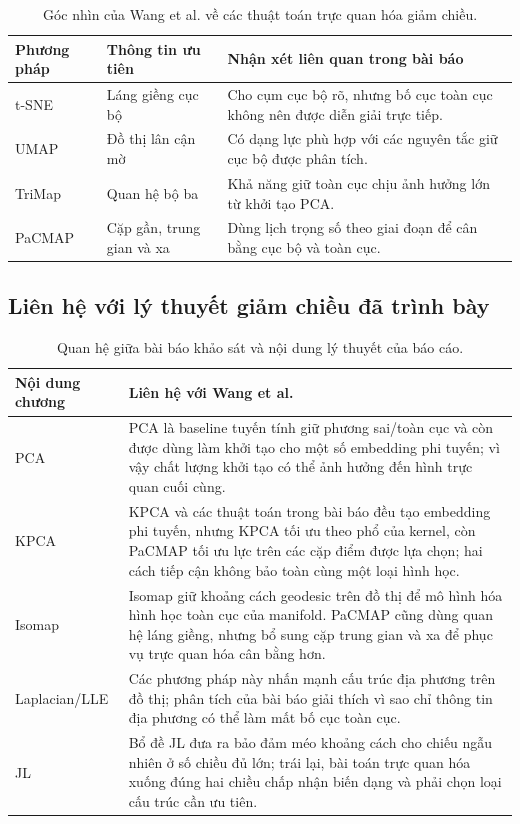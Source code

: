 \begin{table}[H]
  \centering
  \caption{Góc nhìn của Wang et al. về các thuật toán trực quan hóa giảm chiều.}
  \label{tab:related-methods}
  \begin{tabular}{p{}p{}p{}}
    \toprule
    Phương pháp & Thông tin ưu tiên & Nhận xét liên quan trong bài báo \\
    \midrule
    t-SNE & Láng giềng cục bộ & Cho cụm cục bộ rõ, nhưng bố cục toàn cục
    không nên được diễn giải trực tiếp. \\
    UMAP & Đồ thị lân cận mờ & Có dạng lực phù hợp với các nguyên tắc giữ
    cục bộ được phân tích. \\
    TriMap & Quan hệ bộ ba & Khả năng giữ toàn cục chịu ảnh hưởng lớn từ
    khởi tạo PCA. \\
    PaCMAP & Cặp gần, trung gian và xa & Dùng lịch trọng số theo giai đoạn
    để cân bằng cục bộ và toàn cục. \\
    \bottomrule
  \end{tabular}
\end{table}

\subsection{Liên hệ với lý thuyết giảm chiều đã trình bày}

\begin{table}[H]
  \centering
  \caption{Quan hệ giữa bài báo khảo sát và nội dung lý thuyết của báo cáo.}
  \label{tab:related-theory}
  \begin{tabular}{p{}p{}}
    \toprule
    Nội dung chương & Liên hệ với Wang et al. \\
    \midrule
    PCA & PCA là baseline tuyến tính giữ phương sai/toàn cục và còn được
    dùng làm khởi tạo cho một số embedding phi tuyến; vì vậy chất lượng
    khởi tạo có thể ảnh hưởng đến hình trực quan cuối cùng. \\
    KPCA & KPCA và các thuật toán trong bài báo đều tạo embedding phi tuyến,
    nhưng KPCA tối ưu theo phổ của kernel, còn PaCMAP tối ưu lực trên các
    cặp điểm được lựa chọn; hai cách tiếp cận không bảo toàn cùng một loại
    hình học. \\
    Isomap & Isomap giữ khoảng cách geodesic trên đồ thị để mô hình hóa hình
    học toàn cục của manifold. PaCMAP cũng dùng quan hệ láng giềng, nhưng
    bổ sung cặp trung gian và xa để phục vụ trực quan hóa cân bằng hơn. \\
    Laplacian/LLE & Các phương pháp này nhấn mạnh cấu trúc địa phương trên
    đồ thị; phân tích của bài báo giải thích vì sao chỉ thông tin địa phương
    có thể làm mất bố cục toàn cục. \\
    JL & Bổ đề JL đưa ra bảo đảm méo khoảng cách cho chiếu ngẫu nhiên ở số
    chiều đủ lớn; trái lại, bài toán trực quan hóa xuống đúng hai chiều
    chấp nhận biến dạng và phải chọn loại cấu trúc cần ưu tiên. \\
    \bottomrule
  \end{tabular}
\end{table}

